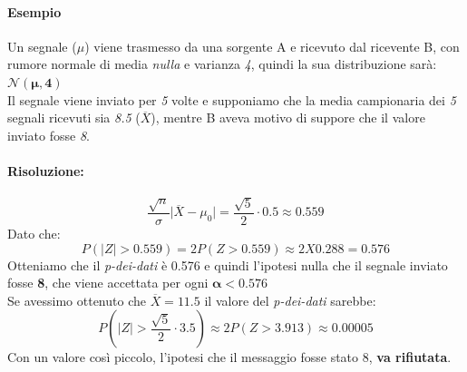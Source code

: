 \documentclass[]{article}
\begin{document}
    \paragraph{Esempio} Un segnale ($\mu$) viene trasmesso da una sorgente A e ricevuto dal ricevente B, con rumore normale  di media \textit{nulla} e varianza \textit{4}, quindi la sua distribuzione sarà: $\boldsymbol{\mathcal{N}(\mu, 4)}$ \\
    Il segnale viene inviato per \textit{5} volte e supponiamo che la media campionaria dei \textit{5} segnali ricevuti sia \textit{8.5} ($\overline{X}$), mentre B aveva motivo di suppore che il valore inviato fosse \textit{8}.
    \paragraph{Risoluzione:}
    \[ \frac{\sqrt{n}}{\sigma} \rvert \overline{X} - \mu_0 \rvert = \frac{\sqrt{5}}{2} \cdot 0.5 \approx 0.559 \]
    Dato che:
    \[ P(|Z| > 0.559) = 2P(Z > 0.559) \approx 2 X 0.288 = \boldsymbol{0.576} \]
    Otteniamo che il \textit{p-dei-dati} è 0.576 e quindi l'ipotesi nulla che il segnale inviato fosse \textbf{8}, che viene accettata per ogni $\boldsymbol{\alpha < 0.576}$ \\
    Se avessimo ottenuto che $\overline{X} = 11.5$ il valore del \textit{p-dei-dati} sarebbe:
    \[ P \left( |Z| > \frac{\sqrt{5}}{2} \cdot 3.5 \right) \approx 2P(Z > 3.913) \approx 0.00005 \]
    Con un valore così piccolo, l'ipotesi che il messaggio fosse stato 8, \textbf{va rifiutata}. \\[3ex]
\end{document}
